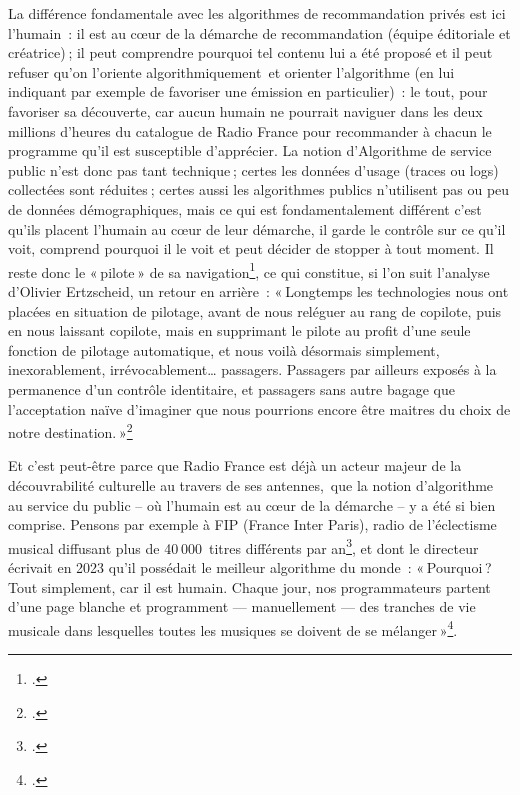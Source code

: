 La différence fondamentale avec les algorithmes de recommandation privés est ici l’humain : il est au cœur de la démarche de recommandation (équipe éditoriale et créatrice) ; il peut comprendre pourquoi tel contenu lui a été proposé et il peut refuser qu’on l’oriente algorithmiquement et orienter l’algorithme (en lui indiquant par exemple de favoriser une émission en particulier) : le tout, pour favoriser sa découverte, car aucun humain ne pourrait naviguer dans les deux millions d’heures du catalogue de Radio France pour recommander à chacun le programme qu’il est susceptible d’apprécier. La notion d’Algorithme de service public n’est donc pas tant technique ; certes les données d’usage (traces ou logs) collectées sont réduites ; certes aussi les algorithmes publics n’utilisent pas ou peu de données démographiques, mais ce qui est fondamentalement différent c’est qu’ils placent l’humain au cœur de leur démarche, il garde le contrôle sur ce qu’il voit, comprend pourquoi il le voit et peut décider de stopper à tout moment. Il reste donc le « pilote » de sa navigation\footcite{ertzscheid2024a}, ce qui constitue, si l’on suit l’analyse d’Olivier Ertzscheid, un retour en arrière : 
« Longtemps les technologies nous ont placées en situation de pilotage, avant de nous reléguer au rang de copilote, puis en nous laissant copilote, mais en supprimant le pilote au profit d’une seule fonction de pilotage automatique, et nous voilà désormais simplement, inexorablement, irrévocablement… passagers. Passagers par ailleurs exposés à la permanence d’un contrôle identitaire, et passagers sans autre bagage que l’acceptation naïve d’imaginer que nous pourrions encore être maitres du choix de notre destination. »\footcite{ertzscheid2024a}

Et c’est peut-être parce que Radio France est déjà un acteur majeur de la découvrabilité culturelle au travers de ses antennes, que la notion d’algorithme au service du public -- où l’humain est au cœur de la démarche -- y a été si bien comprise. Pensons par exemple à FIP (France Inter Paris), radio de l’éclectisme musical diffusant plus de 40 000 titres différents par an\footcite{2023a}, et dont le directeur écrivait en 2023 qu’il possédait le meilleur algorithme du monde : « Pourquoi ? Tout simplement, car il est humain. Chaque jour, nos programmateurs partent d’une page blanche et programment — manuellement — des tranches de vie musicale dans lesquelles toutes les musiques se doivent de se mélanger »\footcite{2023a}.


